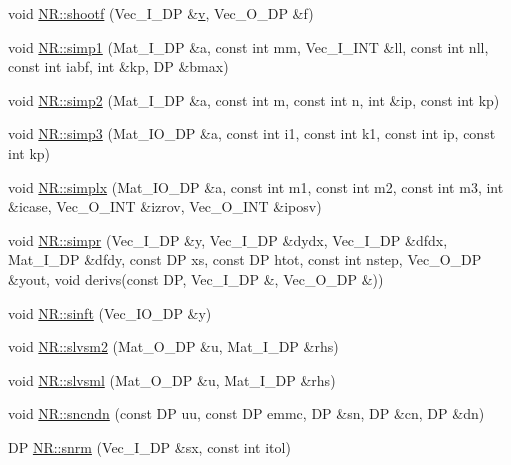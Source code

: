 \begin{DoxyCompactItemize}
\item 
void \mbox{\hyperlink{namespaceNR_a377b3f789f3b63d3472b288e5ee103cd}{N\+R\+::shootf}} (Vec\+\_\+\+I\+\_\+\+DP \&\mbox{\hyperlink{adat__devel_2lib_2hadron_2hadron__timeslice_8cc_a716fc87f5e814be3ceee2405ed6ff22a}{v}}, Vec\+\_\+\+O\+\_\+\+DP \&f)
\item 
void \mbox{\hyperlink{namespaceNR_aabcc7bcebb2a9ffcefb8231216a3b2bf}{N\+R\+::simp1}} (Mat\+\_\+\+I\+\_\+\+DP \&a, const int mm, Vec\+\_\+\+I\+\_\+\+I\+NT \&ll, const int nll, const int iabf, int \&kp, DP \&bmax)
\item 
void \mbox{\hyperlink{namespaceNR_a7f8a4de14a8e48d4a3dd9a913b593f94}{N\+R\+::simp2}} (Mat\+\_\+\+I\+\_\+\+DP \&a, const int m, const int n, int \&ip, const int kp)
\item 
void \mbox{\hyperlink{namespaceNR_a534aa06bc7a2ffc101eb3606158d7292}{N\+R\+::simp3}} (Mat\+\_\+\+I\+O\+\_\+\+DP \&a, const int i1, const int k1, const int ip, const int kp)
\item 
void \mbox{\hyperlink{namespaceNR_aef5e28f4e523bd00d12f051bbaa68c26}{N\+R\+::simplx}} (Mat\+\_\+\+I\+O\+\_\+\+DP \&a, const int m1, const int m2, const int m3, int \&icase, Vec\+\_\+\+O\+\_\+\+I\+NT \&izrov, Vec\+\_\+\+O\+\_\+\+I\+NT \&iposv)
\item 
void \mbox{\hyperlink{namespaceNR_ae748fa4c5f015f06df38e8bafc21840f}{N\+R\+::simpr}} (Vec\+\_\+\+I\+\_\+\+DP \&y, Vec\+\_\+\+I\+\_\+\+DP \&dydx, Vec\+\_\+\+I\+\_\+\+DP \&dfdx, Mat\+\_\+\+I\+\_\+\+DP \&dfdy, const DP xs, const DP htot, const int nstep, Vec\+\_\+\+O\+\_\+\+DP \&yout, void derivs(const DP, Vec\+\_\+\+I\+\_\+\+DP \&, Vec\+\_\+\+O\+\_\+\+DP \&))
\item 
void \mbox{\hyperlink{namespaceNR_a889e9d27c3d64efbace8e4269ee49396}{N\+R\+::sinft}} (Vec\+\_\+\+I\+O\+\_\+\+DP \&y)
\item 
void \mbox{\hyperlink{namespaceNR_acedae47de69f9d0402a28d9a716b2fa2}{N\+R\+::slvsm2}} (Mat\+\_\+\+O\+\_\+\+DP \&u, Mat\+\_\+\+I\+\_\+\+DP \&rhs)
\item 
void \mbox{\hyperlink{namespaceNR_ae63f80a859ca5a86551c9b2f4b04fdef}{N\+R\+::slvsml}} (Mat\+\_\+\+O\+\_\+\+DP \&u, Mat\+\_\+\+I\+\_\+\+DP \&rhs)
\item 
void \mbox{\hyperlink{namespaceNR_a047d02acf11afe02da3c1da8c748e208}{N\+R\+::sncndn}} (const DP uu, const DP emmc, DP \&sn, DP \&cn, DP \&dn)
\item 
DP \mbox{\hyperlink{namespaceNR_ad2b7cce8e123dc0d8dc69bf32a719f94}{N\+R\+::snrm}} (Vec\+\_\+\+I\+\_\+\+DP \&sx, const int itol)
\item 

\end{DoxyCompactItemize}
